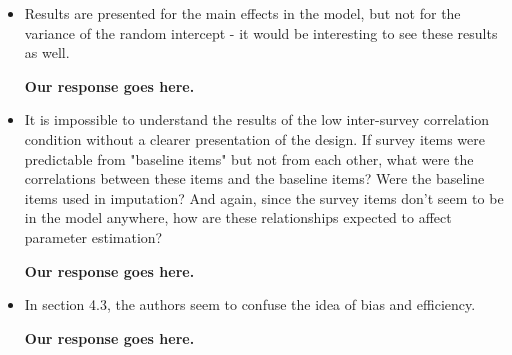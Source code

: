 \documentclass[letterpaper,12pt]{article}
\begin{document}
\begin{itemize}
\item Results are presented for the main effects in the model, but not for the variance of the random intercept - it would be interesting to see these results as well.

{\bf Our response goes here.}

\item It is impossible to understand the results of the low inter-survey correlation condition without a clearer presentation of the design. If survey items were predictable from "baseline items" but not from each other, what were the correlations between these items and the baseline items? Were the baseline items used in imputation? And again, since the survey items don't seem to be in the model anywhere, how are these relationships expected to affect parameter estimation?

{\bf Our response goes here.}

\item In section 4.3, the authors seem to confuse the idea of bias and efficiency.

{\bf Our response goes here.}

\end{itemize}





\end{document}
